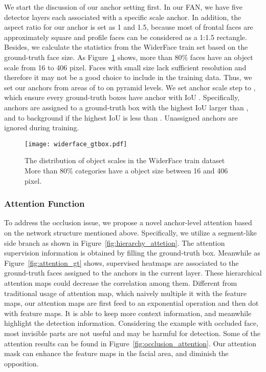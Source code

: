 \documentclass[10pt,twocolumn,letterpaper]{article}
\begin{document}
We start the discussion of our anchor setting first. In our FAN, we have five detector layers each associated with a specific scale anchor. In addition, the aspect ratio for our anchor is set as 1 and 1.5, because most of frontal faces are approximately square and profile faces can be considered as a 1:1.5 rectangle. Besides, we calculate the statistics from the WiderFace train set based on the ground-truth face size. As Figure~\ref{fig:widerface} shows, more than 80\% faces have an object scale from 16 to 406 pixel. Faces with small size lack sufficient resolution and therefore it may not be a good choice to include in the training data. Thus, we set our anchors from areas of  to  on pyramid levels. We set anchor scale step to , which ensure every ground-truth boxes have anchor with IoU . Specifically, anchors are assigned to a ground-truth box with the highest IoU larger than , and to background if the highest IoU is less than . Unassigned anchors are ignored during training.

\begin{figure}[h]
\begin{center}
    \texttt{[image: widerface\_gtbox.pdf]}
\end{center}
    \caption{The distribution of object scales in the WiderFace train dataset More than 80\% categories have a object
size between 16 and 406 pixel.}
\label{fig:widerface}
\end{figure}




\subsubsection{Attention Function\label{sec:attention func}}

To address the occlusion issue, we propose a novel anchor-level attention based on the network structure mentioned above. Specifically, we utilize a segment-like side branch as shown in Figure~\ref{fig:hierarchy_attetion}. The attention supervision information is obtained by filling the ground-truth box. Meanwhile as Figure~\ref{fig:attention_gt} shows, supervised heatmaps are associated to the ground-truth faces assigned to the anchors in the current layer. These hierarchical attention maps could decrease the correlation among them. Different from traditional usage of attention map, which naively multiple it with the feature maps, our attention maps are first feed to an exponential operation and then dot with feature maps. It is able to keep more context information, and meanwhile highlight the detection information. Considering the example with occluded face, most invisible parts are not useful and may be harmful for detection. Some of the attention results can be found in Figure~\ref{fig:occlusion_attention}. Our attention mask can enhance the feature maps in the facial area, and diminish the opposition.
\end{document}
